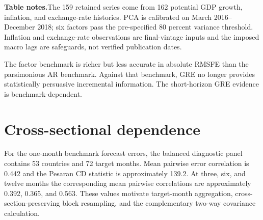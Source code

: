 \documentclass[12pt]{article}
\newcommand{\TableNote}[1]{%
  \par\vspace{0.65ex}\noindent
  \begin{minipage}{0.97\linewidth}\footnotesize\singlespacing\raggedright
  \textbf{Table notes.}\enspace #1
  \end{minipage}}
\begin{document}
\begin{table}[htbp]
\centering\scriptsize
\caption{GRE against the wide factor-augmented benchmark at one month}
\TableNote{The 159 retained series come from 162 potential GDP growth, inflation, and exchange-rate histories. PCA is calibrated on March 2016--December 2018; six factors pass the pre-specified 80 percent variance threshold. Inflation and exchange-rate observations are final-vintage inputs and the imposed macro lags are safeguards, not verified publication dates.}
\end{table}
The factor benchmark is richer but less accurate in absolute RMSFE than the parsimonious AR benchmark. Against that benchmark, GRE no longer provides statistically persuasive incremental information. The short-horizon GRE evidence is benchmark-dependent.


\section{Cross-sectional dependence}
For the one-month benchmark forecast errors, the balanced diagnostic panel contains 53 countries and 72 target months. Mean pairwise error correlation is 0.442 and the Pesaran CD statistic is approximately 139.2. At three, six, and twelve months the corresponding mean pairwise correlations are approximately 0.392, 0.365, and 0.563. These values motivate target-month aggregation, cross-section-preserving block resampling, and the complementary two-way covariance calculation.
\end{document}
